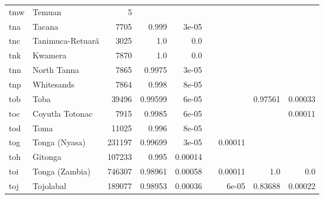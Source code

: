 \documentclass[11pt]{article}
\begin{document}
\begin{table*}[h]
{\begin{tabular}{llrrrrrrr}
tmw         & Temuan         & 5         &          &          &          &          &          &          \\

tna         & Tacana         & 7705         & 0.999         & 3e-05         &          &          &          &          \\

tnc         & Tanimuca-Retuarã         & 3025         & 1.0         & 0.0         &          &          &          &          \\

tnk         & Kwamera         & 7870         & 1.0         & 0.0         &          &          &          &          \\

tnn         & North Tanna         & 7865         & 0.9975         & 3e-05         &          &          &          &          \\

tnp         & Whitesands         & 7864         & 0.998         & 8e-05         &          &          &          &          \\

tob         & Toba         & 39496         & 0.99599         & 6e-05         &          &          & 0.97561         & 0.00033         \\

toc         & Coyutla Totonac         & 7915         & 0.9985         & 6e-05         &          &          &          & 0.00011         \\

tod         & Toma         & 11025         & 0.996         & 8e-05         &          &          &          &          \\

tog         & Tonga (Nyasa)         & 231197         & 0.99699         & 3e-05         &          & 0.00011         &          &          \\

toh         & Gitonga         & 107233         & 0.995         & 0.00014         &          &          &          &          \\

toi         & Tonga (Zambia)         & 746307         & 0.98961         & 0.00058         &          & 0.00011         & 1.0         & 0.0         \\

toj         & Tojolabal         & 189077         & 0.98953         & 0.00036         &          & 6e-05         & 0.83688         & 0.00022         \\


\end{tabular}}
\end{table*}
\end{document}
